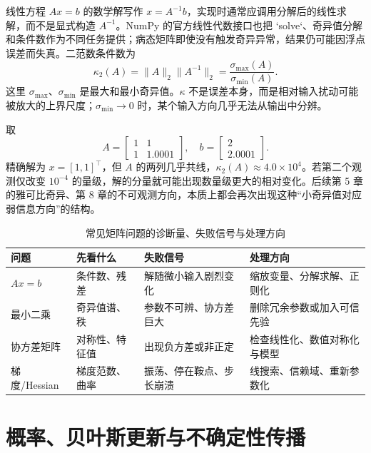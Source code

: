 线性方程 $Ax=b$ 的数学解写作 $x=A^{-1}b$，实现时通常应调用分解后的线性求解，而不是显式构造 $A^{-1}$。NumPy 的官方线性代数接口也把 `solve`、奇异值分解和条件数作为不同任务提供；病态矩阵即使没有触发奇异异常，结果仍可能因浮点误差而失真\cite{harris2020numpy,numpy_linalg_docs}。二范数条件数为
\begin{equation}
\kappa_2(A)=\lVert A\rVert_2\lVert A^{-1}\rVert_2
=\frac{\sigma_{\max}(A)}{\sigma_{\min}(A)}.
\label{eq:condition-number}
\end{equation}
这里 $\sigma_{\max}$、$\sigma_{\min}$ 是最大和最小奇异值。$\kappa$ 不是误差本身，而是相对输入扰动可能被放大的上界尺度；$\sigma_{\min}\to0$ 时，某个输入方向几乎无法从输出中分辨。

取
\[
A=\begin{bmatrix}1&1\\1&1.0001\end{bmatrix},\quad
b=\begin{bmatrix}2\\2.0001\end{bmatrix}.
\]
精确解为 $x=[1,1]^\top$，但 $A$ 的两列几乎共线，$\kappa_2(A)\approx4.0\times10^4$。若第二个观测仅改变 $10^{-4}$ 的量级，解的分量就可能出现数量级更大的相对变化。后续第 5 章的雅可比奇异、第 8 章的不可观测方向，本质上都会再次出现这种“小奇异值对应弱信息方向”的结构。

\begin{table}[H]
\centering
\caption{常见矩阵问题的诊断量、失败信号与处理方向}
\label{tab:linear-algebra-failures}
\small
\begin{tabularx}{\textwidth}{p{}p{}p{}Y}
\toprule
问题 & 先看什么 & 失败信号 & 处理方向\\
\midrule
$Ax=b$ & 条件数、残差 & 解随微小输入剧烈变化 & 缩放变量、分解求解、正则化\\
最小二乘 & 奇异值谱、秩 & 参数不可辨、协方差巨大 & 删除冗余参数或加入可信先验\\
协方差矩阵 & 对称性、特征值 & 出现负方差或非正定 & 检查线性化、数值对称化与模型\\
梯度/Hessian & 梯度范数、曲率 & 振荡、停在鞍点、步长崩溃 & 线搜索、信赖域、重新参数化\\
\bottomrule
\end{tabularx}
\end{table}

\section{概率、贝叶斯更新与不确定性传播}

